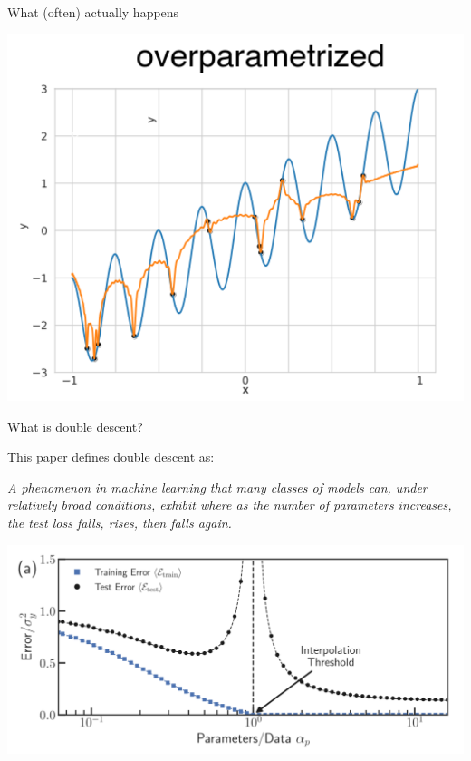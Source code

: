 \documentclass{beamer}
\begin{document}
\begin{frame}{What (often) actually happens}
\begin{center}
    \includegraphics[scale=0.28]{overparam.png}
\end{center}
\end{frame}


\begin{frame}{What is double descent?}
    
This paper defines double descent as: \\
\hspace{1.5cm}

\emph{A phenomenon in machine learning that many classes of models can, under relatively broad conditions, exhibit where as the number of parameters increases, the test loss falls, rises, then falls again.}
\pause
\begin{center}
\includegraphics[scale=0.22]{ddd.png}
\end{center}

\end{frame}
\end{document}
